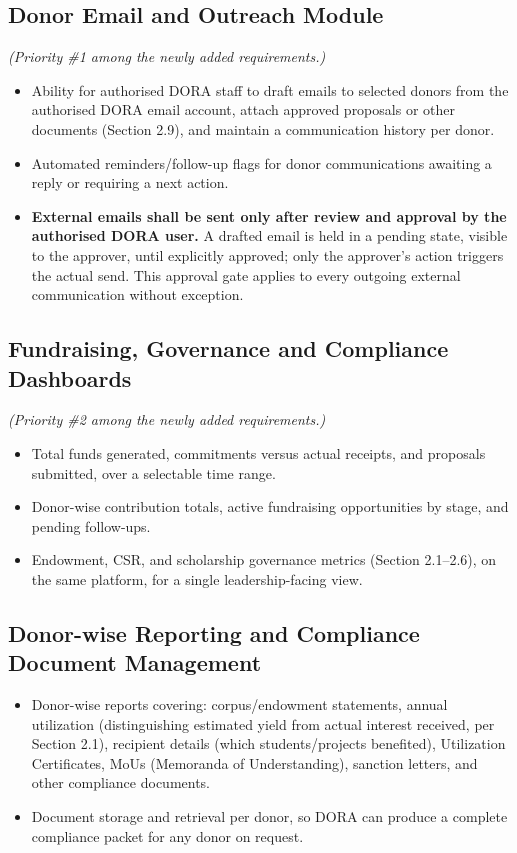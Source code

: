 \documentclass[11pt]{article}
\begin{document}
\subsection{Donor Email and Outreach Module}
\label{sec:email}
\textit{(Priority \#1 among the newly added requirements.)}
\begin{itemize}[leftmargin=1.4em, itemsep=3pt]
\item Ability for authorised DORA staff to draft emails to selected donors from the authorised DORA email account, attach approved proposals or other documents (Section 2.9), and maintain a communication history per donor.
\item Automated reminders/follow-up flags for donor communications awaiting a reply or requiring a next action.
\item \textbf{External emails shall be sent only after review and approval by the authorised DORA user.} A drafted email is held in a pending state, visible to the approver, until explicitly approved; only the approver's action triggers the actual send. This approval gate applies to every outgoing external communication without exception.
\end{itemize}

\subsection{Fundraising, Governance and Compliance Dashboards}
\textit{(Priority \#2 among the newly added requirements.)}
\begin{itemize}[leftmargin=1.4em, itemsep=3pt]
\item Total funds generated, commitments versus actual receipts, and proposals submitted, over a selectable time range.
\item Donor-wise contribution totals, active fundraising opportunities by stage, and pending follow-ups.
\item Endowment, CSR, and scholarship governance metrics (Section 2.1--2.6), on the same platform, for a single leadership-facing view.
\end{itemize}

\subsection{Donor-wise Reporting and Compliance Document Management}
\begin{itemize}[leftmargin=1.4em, itemsep=3pt]
\item Donor-wise reports covering: corpus/endowment statements, annual utilization (distinguishing estimated yield from actual interest received, per Section 2.1), recipient details (which students/projects benefited), Utilization Certificates, MoUs (Memoranda of Understanding), sanction letters, and other compliance documents.
\item Document storage and retrieval per donor, so DORA can produce a complete compliance packet for any donor on request.
\end{itemize}
\end{document}

